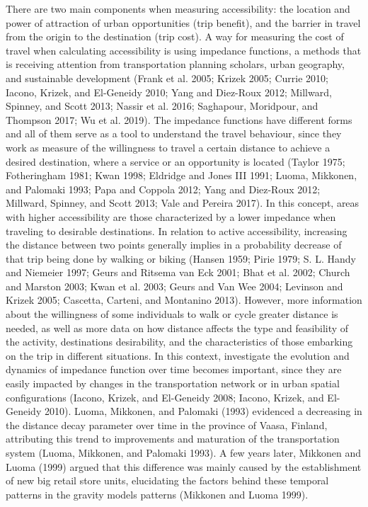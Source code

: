 \documentclass[preprint, 3p,
authoryear]{elsarticle} %
\begin{document}
There are two main components when measuring accessibility: the location
and power of attraction of urban opportunities (trip benefit), and the
barrier in travel from the origin to the destination (trip cost). A way
for measuring the cost of travel when calculating accessibility is using
impedance functions, a methods that is receiving attention from
transportation planning scholars, urban geography, and sustainable
development (Frank et al. 2005; Krizek 2005; Currie 2010; Iacono,
Krizek, and El-Geneidy 2010; Yang and Diez-Roux 2012; Millward, Spinney,
and Scott 2013; Nassir et al. 2016; Saghapour, Moridpour, and Thompson
2017; Wu et al. 2019). The impedance functions have different forms and
all of them serve as a tool to understand the travel behaviour, since
they work as measure of the willingness to travel a certain distance to
achieve a desired destination, where a service or an opportunity is
located (Taylor 1975; Fotheringham 1981; Kwan 1998; Eldridge and Jones
III 1991; Luoma, Mikkonen, and Palomaki 1993; Papa and Coppola 2012;
Yang and Diez-Roux 2012; Millward, Spinney, and Scott 2013; Vale and
Pereira 2017). In this concept, areas with higher accessibility are
those characterized by a lower impedance when traveling to desirable
destinations. In relation to active accessibility, increasing the
distance between two points generally implies in a probability decrease
of that trip being done by walking or biking (Hansen 1959; Pirie 1979;
S. L. Handy and Niemeier 1997; Geurs and Ritsema van Eck 2001; Bhat et
al. 2002; Church and Marston 2003; Kwan et al. 2003; Geurs and Van Wee
2004; Levinson and Krizek 2005; Cascetta, Carteni, and Montanino 2013).
However, more information about the willingness of some individuals to
walk or cycle greater distance is needed, as well as more data on how
distance affects the type and feasibility of the activity, destinations
desirability, and the characteristics of those embarking on the trip in
different situations. In this context, investigate the evolution and
dynamics of impedance function over time becomes important, since they
are easily impacted by changes in the transportation network or in urban
spatial configurations (Iacono, Krizek, and El-Geneidy 2008; Iacono,
Krizek, and El-Geneidy 2010). Luoma, Mikkonen, and Palomaki (1993)
evidenced a decreasing in the distance decay parameter over time in the
province of Vaasa, Finland, attributing this trend to improvements and
maturation of the transportation system (Luoma, Mikkonen, and Palomaki
1993). A few years later, Mikkonen and Luoma (1999) argued that this
difference was mainly caused by the establishment of new big retail
store units, elucidating the factors behind these temporal patterns in
the gravity models patterns (Mikkonen and Luoma 1999).
\end{document}
